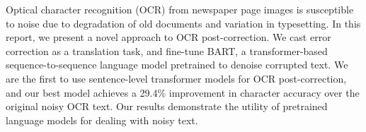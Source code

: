 Optical character recognition (OCR) from newspaper page images is susceptible to noise due to degradation of old documents and variation in typesetting. In this report, we present a novel approach to OCR post-correction. We cast error correction as a translation task, and fine-tune BART, a transformer-based sequence-to-sequence language model pretrained to denoise corrupted text. We are the first to use sentence-level transformer models for OCR post-correction, and our best model achieves a 29.4\% improvement in character accuracy over the original noisy OCR text. Our results demonstrate the utility of pretrained language models for dealing with noisy text.
